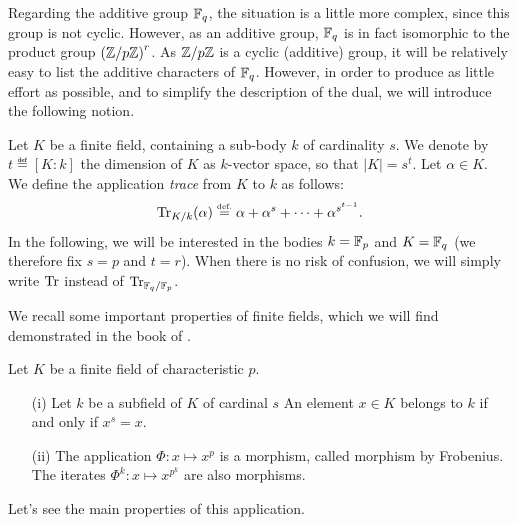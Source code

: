  
Regarding the additive group $ \mathbb{F}_q $, the situation is a little more complex, since this group is not cyclic. However, as an additive group, $ \mathbb{F}_q $ is in fact isomorphic to the product group $ \left(\mathbb{Z}/p \mathbb{Z} \right)^r $. As $ \mathbb{Z}/p \mathbb{Z} $ is a cyclic (additive) group, it will be relatively easy to list the additive characters of $ \mathbb{F}_q $. However, in order to produce as little effort as possible, and to simplify the description of the dual, we will introduce the following notion.
 
\begin{defn}
 \label{notation-26} Let $ K $ be a finite field, containing a sub-body $ k $ of cardinality $ s $. We denote by $ t \eqdef [K: k] $ the dimension of $ K $ as $k$-vector space, so that $ | K | = s^t $. Let $ \alpha \in K $. We define the application \textit{trace} from $ K $ to $ k $ as follows:
\begin{equation*}
\operatorname{Tr}_{K / k} (\alpha) \stackrel{\mbox{\upshape\tiny def.}}{=} \alpha + \alpha^s + \cdots + \alpha^{s^{t-1}}.
\end{equation*}
In the following, we will be interested in the bodies $ k = \mathbb{F}_p $ and $ K = \mathbb{F}_q $ (we therefore fix $ s = p $ and $ t = r $). When there is no risk of confusion, we will simply write $ \operatorname{Tr} $ instead of $ \operatorname{Tr}_{\mathbb{F}_q / \mathbb{F}_p} $.
\end{defn}
 
We recall some important properties of finite fields, which we will find demonstrated in the book of  \cite{perrin}.
 
\begin{prop}
Let $ K $ be a finite field of characteristic $ p $. \begin{itemize}
\item [{\upshape (i)}] Let $ k $ be a subfield of $ K $ of cardinal $ s $ An element $ x \in K $ belongs to $ k $ if and only if $ x^s = x $.
\item [{\upshape (ii)}]   The application $ \Phi: x \mapsto x^p $ is a morphism, called morphism by Frobenius. The iterates $ \Phi^k: x \mapsto x^{p^k} $ are also morphisms.
\end{itemize}
\end{prop}
 
Let's see the main properties of this application.
 
